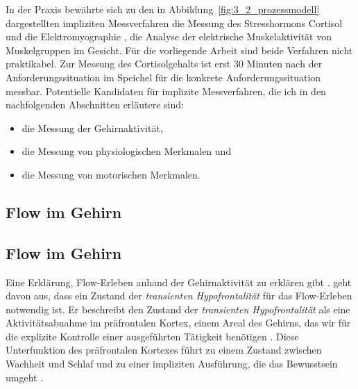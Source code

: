 In der Praxis bewährte sich zu den in Abbildung~\ref{fig:3_2_prozessmodell} dargestellten impliziten Messverfahren die Messung des Stresshormons Cortisol \citep{Keller2011, Peifer2014, Peifer2015} und die Elektromyographie , die Analyse der elektrische Muskelaktivität von Muskelgruppen im Gesicht\citep{Kivikangas2006, Nacke2008, deManzano2010}. Für die vorliegende Arbeit sind beide Verfahren nicht praktikabel. Zur Messung des Cortisolgehalts ist erst 30 Minuten nach der Anforderungssituation im Speichel für die konkrete Anforderungssituation messbar. 
Potentielle Kandidaten für implizite Messverfahren, die ich in den nachfolgenden Abschnitten erläutere sind:

\begin{itemize}

	\item die Messung der Gehirnaktivität,

 	\item die Messung von physiologischen Merkmalen und

 	\item die Messung von motorischen Merkmalen.

\end{itemize}

\subsection{Flow im Gehirn} %
\label{sub:flow_im_gehirn}

 
 \subsection{Flow im Gehirn}

 Eine Erklärung, Flow-Erleben anhand der Gehirnaktivität zu erklären gibt \citet{Dietrich2004}. \citet[S.~758f.]{Dietrich2004} geht davon aus, dass ein Zustand der \emph{transienten Hypofrontalität} für das Flow-Erleben notwendig ist. Er beschreibt den Zustand der \emph{transienten Hypofrontalität} als eine Aktivitätsabnahme im präfrontalen Kortex, einem Areal des Gehirns, das wir für die explizite Kontrolle einer ausgeführten Tätigkeit benötigen \citep[vgl.][]{Dietrich2003, Dietrich2004}. Diese Unterfunktion des präfrontalen Kortexes führt zu einem Zustand zwischen Wachheit und Schlaf \citep[vgl.][S.~241]{Dietrich2003} und zu einer impliziten Ausführung, die das Bewusstsein umgeht \citep[vgl.][S.~753]{Dietrich2004}.

